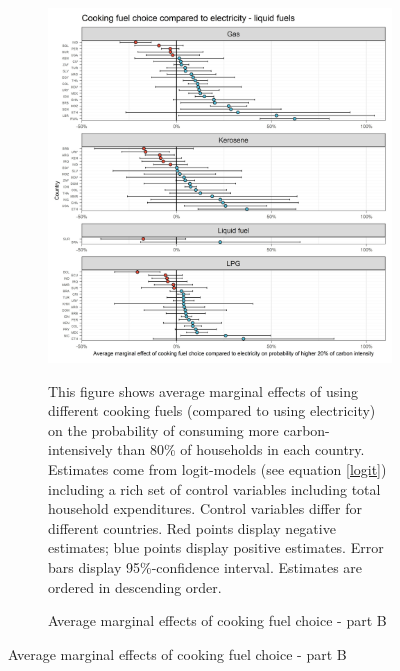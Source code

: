  \begin{figure}[ht!]\ContinuedFloat
   \centering
   \begin{subfigure}[b]{\textwidth}
   \centering
   \caption{Average marginal effects of cooking fuel choice - part B} \label{fig:Logit_ME_CF_2}
   \includegraphics{1_Figures/Analysis_Logit_Models_Marginal_Effects/Average_Marginal_Effects_affected_upper_80_CF_Electricity B_2017.jpg}
   \begin{subcaption2}
     This figure shows average marginal effects of using different cooking fuels (compared to using electricity) on the probability of consuming more carbon-intensively than 80\% of households in each country. Estimates come from logit-models (see equation \ref{logit}) including a rich set of control variables including total household expenditures. Control variables differ for different countries. Red points display negative estimates; blue points display positive estimates. Error bars display 95\%-confidence interval. Estimates are ordered in descending order.
   \end{subcaption2}
   \end{subfigure}
 \end{figure}
 \clearpage

